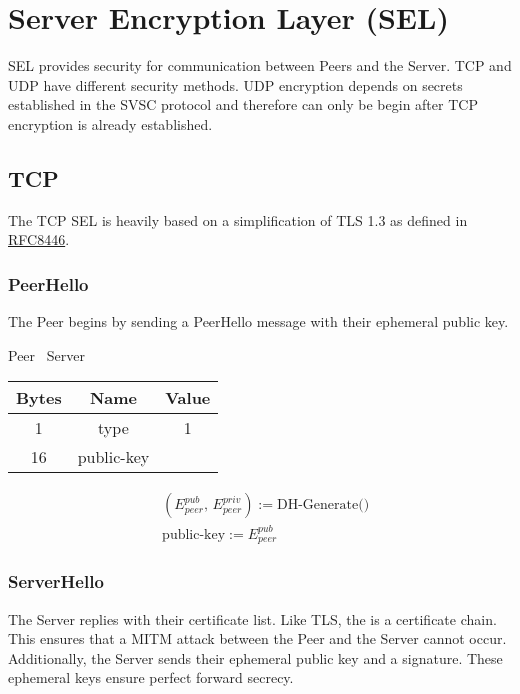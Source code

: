 \section{Server Encryption Layer (SEL)}

SEL provides security for communication between Peers and the Server. TCP and UDP have
different security methods. UDP encryption depends on secrets established in the SVSC protocol and therefore can only
be begin after TCP encryption is already established.

\subsection{TCP}

The TCP SEL is heavily based on a simplification of TLS 1.3 as defined in
\href{https://datatracker.ietf.org/doc/html/rfc8446}{RFC8446}.

\subsubsection{PeerHello}

The Peer begins by sending a PeerHello message with their ephemeral public key.

\begin{center}
    Peer \textrightarrow\ Server\\
    \begin{tabular}{|c|c|c|}
        \hline
        \textbf{Bytes} & \textbf{Name} & \textbf{Value} \\
        \hline
        1              & type          & 1              \\
        \hline
        16             & public-key    &                \\
        \hline
    \end{tabular}
\end{center}

\begin{align*}
    &(E_{peer}^{pub},\,E_{peer}^{priv}) := \text{DH-Generate()}\\
    &\text{public-key} := E_{peer}^{pub}
\end{align*}

\subsubsection{ServerHello}

The Server replies with their certificate list. Like TLS, the is a certificate chain. This ensures that a MITM attack
between the Peer and the Server cannot occur. Additionally, the Server sends their ephemeral public key and a
signature. These ephemeral keys ensure perfect forward secrecy.

